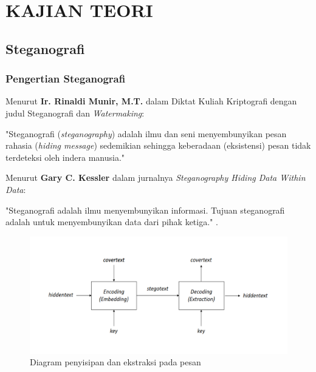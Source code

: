 
\chapter{KAJIAN TEORI}                

\section{Steganografi}
	\subsection{Pengertian Steganografi}
	Menurut \textbf{Ir. Rinaldi Munir, M.T.} dalam Diktat Kuliah Kriptografi dengan judul Steganografi dan \emph{Watermaking}:
	
	"Steganografi (\emph{steganography}) adalah ilmu dan seni menyembunyikan pesan rahasia (\emph{hiding message}) sedemikian sehingga keberadaan (eksistensi) pesan tidak terdeteksi oleh indera manusia." \cite{munir}
	
	Menurut \textbf{Gary C. Kessler} dalam jurnalnya \emph{Steganography Hiding Data Within Data}:
	
	"Steganografi adalah ilmu menyembunyikan informasi. Tujuan steganografi adalah untuk menyembunyikan data dari pihak ketiga." \cite{kessler}.
	
	\begin{figure}[H]
		\centering
		\includegraphics[width=1\textwidth]{gambar/diagram_steganografi}
		\caption{Diagram penyisipan dan ekstraksi pada pesan}
		\label{diagram_steganografi}
	\end{figure} 
	
